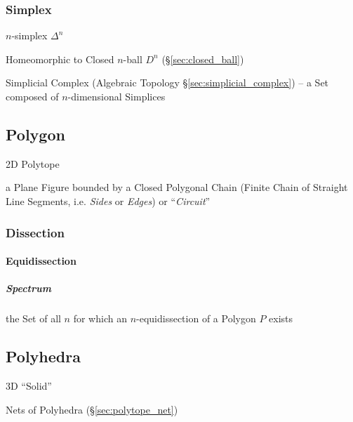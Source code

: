 \subsubsection{Simplex}\label{sec:simplex}

$n$-simplex $\Delta^n$

Homeomorphic to Closed $n$-ball $D^n$ (\S\ref{sec:closed_ball})

\fist Simplicial Complex (Algebraic Topology \S\ref{sec:simplicial_complex}) --
a Set composed of $n$-dimensional Simplices



\subsection{Polygon}\label{sec:polygon}

2D Polytope

a Plane Figure bounded by a Closed Polygonal Chain (Finite Chain of Straight
Line Segments, i.e. \emph{Sides} or \emph{Edges}) or ``\emph{Circuit}''



\subsubsection{Dissection}\label{sec:dissection}

\paragraph{Equidissection}\label{sec:equidissection}\hfill

\subparagraph{Spectrum}\label{sec:polygon_spectrum}\hfill

the Set of all $n$ for which an $n$-equidissection of a Polygon $P$ exists



\subsection{Polyhedra}\label{sec:polyhedra}

3D ``Solid''

Nets of Polyhedra (\S\ref{sec:polytope_net})

